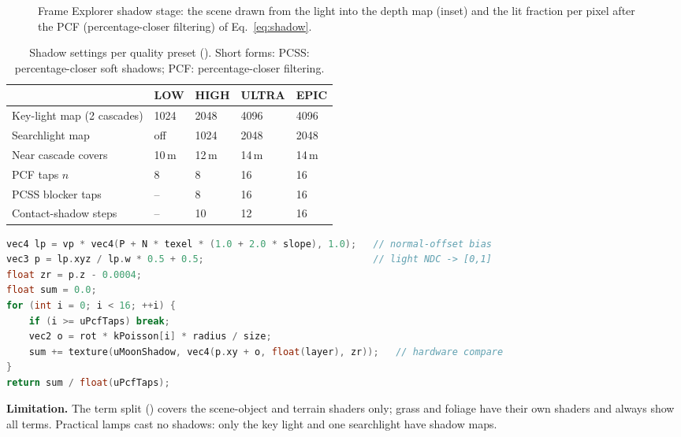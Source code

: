 \begin{figure}[htbp]
\centering{}
\caption{Frame Explorer shadow stage: the scene drawn from the light into the depth map (inset) and the lit fraction
per pixel after the PCF (percentage-closer filtering) of Eq.~\eqref{eq:shadow}.}
\label{fig:shadowstage}
\end{figure}

\begin{table}[htbp]
\caption{Shadow settings per quality preset (). Short forms: PCSS: percentage-closer soft shadows; PCF: percentage-closer filtering.}\label{tab:shadowq}
\centering\small
\begin{tabular}{@{}lllll@{}}
\toprule
 & LOW & HIGH & ULTRA & EPIC\\\midrule
Key-light map (2 cascades) & 1024 & 2048 & 4096 & 4096\\
Searchlight map & off & 1024 & 2048 & 2048\\
Near cascade covers & 10\,m & 12\,m & 14\,m & 14\,m\\
PCF taps $n$ & 8 & 8 & 16 & 16\\
PCSS blocker taps & -- & 8 & 16 & 16\\
Contact-shadow steps & -- & 10 & 12 & 16\\
\bottomrule
\end{tabular}
\end{table}

\begin{lstlisting}[language=C++,caption={The PCF (percentage-closer filtering) loop of one cascade (\code{ShaderSources.cpp: cascadeShadow}, OpenGL Shading Language).}]
vec4 lp = vp * vec4(P + N * texel * (1.0 + 2.0 * slope), 1.0);   // normal-offset bias
vec3 p = lp.xyz / lp.w * 0.5 + 0.5;                              // light NDC -> [0,1]
float zr = p.z - 0.0004;
float sum = 0.0;
for (int i = 0; i < 16; ++i) {
    if (i >= uPcfTaps) break;
    vec2 o = rot * kPoisson[i] * radius / size;
    sum += texture(uMoonShadow, vec4(p.xy + o, float(layer), zr));   // hardware compare
}
return sum / float(uPcfTaps);
\end{lstlisting}

\textbf{Limitation.} The term split () covers the scene-object and terrain shaders only; grass and
foliage have their own shaders and always show all terms. Practical lamps cast no shadows: only the key light and one
searchlight have shadow maps.
